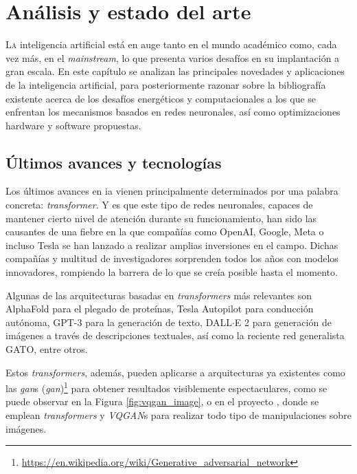 \chapter{Análisis y estado del arte}
\label{chap:analisis_estado_arte}

\lettrine{L}{a} inteligencia artificial está en auge tanto en el mundo académico como, cada vez más, en el \textit{mainstream}, lo que presenta varios desafíos en su implantación a gran escala. En este capítulo se analizan las principales novedades y aplicaciones de la inteligencia artificial, para posteriormente razonar sobre la bibliografía existente acerca de los desafíos energéticos y computacionales a los que se enfrentan los mecanismos basados en redes neuronales, así como optimizaciones hardware y software propuestas.

\section{Últimos avances y tecnologías}
\label{sec:ultimos_avances_tecnologias}
Los últimos avances en \acrshort{ia} vienen principalmente determinados por una palabra concreta: \textit{transformer}. Y es que este tipo de redes neuronales, capaces de mantener cierto nivel de atención \cite{vaswani2017attention_all_you_need} durante su funcionamiento, han sido las causantes de una fiebre en la que compañías como OpenAI, Google, Meta o incluso Tesla se han lanzado a realizar amplias inversiones en el campo. Dichas compañías y multitud de investigadores sorprenden todos los años con modelos innovadores, rompiendo la barrera de lo que se creía posible hasta el momento.

Algunas de las arquitecturas basadas en \textit{transformers} más relevantes son AlphaFold para el plegado de proteínas, Tesla Autopilot para conducción autónoma, GPT-3 para la generación de texto, DALL$\cdot$E 2 para generación de imágenes a través de descripciones textuales, así como la reciente red generalista GATO, entre otros.

Estos \textit{transformers}, además, pueden aplicarse a arquitecturas ya existentes como las \textit{\acrshort{gan}}s (\textit{\acrlong{gan}})\footnote{\url{https://en.wikipedia.org/wiki/Generative\_adversarial\_network}} para obtener resultados visiblemente espectaculares, como se puede observar en la Figura \ref{fig:vqgan_image}, o en el proyecto \cite{chang2022maskgit}, donde se emplean \textit{transformers} y \textit{VQGAN}s para realizar todo tipo de manipulaciones sobre imágenes.

